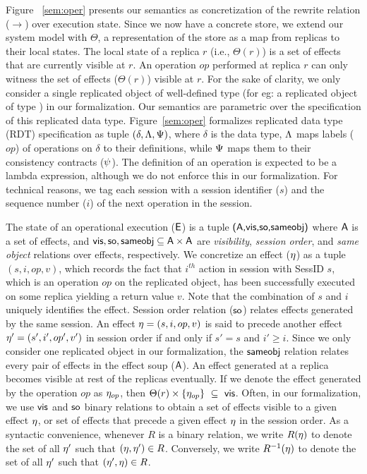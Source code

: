 Figure ~\ref{sem:oper} presents our semantics as concretization of the rewrite
relation ($\xrightarrow{}$) over execution state. Since we now have a concrete
store, we extend our system model with $\Theta$, a representation of the store
as a map from replicas to their local states. The local state of a replica $r$
(i.e., $\Theta(r)$) is a set of effects that are currently visible at $r$.  An
operation $op$ performed at replica $r$ can only witness the set of effects
($\Theta(r)$) visible at $r$. For the sake of clarity, we only consider a
single replicated object of well-defined type (for eg: a replicated object of
type ) in our formalization.  Our semantics are parametric over
the specification of this replicated data type. Figure~\ref{sem:oper}
formalizes replicated data type (RDT) specification as tuple
$(\delta,\Lambda,\Psi)$, where $\delta$ is the data type, $\Lambda$ maps labels
($op$) of operations on $\delta$ to their definitions, while $\Psi$ maps them
to their consistency contracts ($\psi$). The definition of an operation is
expected to be a lambda expression, although we do not enforce this in our
formalization. For technical reasons, we tag each session with a session
identifier ($s$) and the sequence number ($i$) of the next operation in the
session.

The state of an operational execution (${\normalfont \textsf{E}}$) is a tuple ${\normalfont \textsf{({\normalfont \textsf{A}},\allowbreak {\normalfont \textsf{vis}},\allowbreak {\normalfont \textsf{so}},\allowbreak {\normalfont \textsf{sameobj}})}}$ where
${\normalfont \textsf{A}}$ is a set of effects, and ${\normalfont \textsf{vis}},{\normalfont \textsf{so}}, {\normalfont \textsf{sameobj}} \subseteq {\normalfont \textsf{A}}
\times {\normalfont \textsf{A}}$ are \emph{visibility}, \emph{session order}, and \emph{same
object} relations over effects, respectively. We concretize an effect ($\eta$)
as a tuple $(s,i,op,v)$, which records the fact that $i^{th}$ action in session
with {\sf SessID} $s$, which is an operation $op$ on the replicated object, has
been successfully executed on some replica yielding a return value $v$. Note
that the combination of $s$ and $i$ uniquely identifies the effect. Session
order relation (${\normalfont \textsf{so}}$) relates effects generated by the same session. An
effect $\eta = (s,i,op,v)$ is said to precede another effect $\eta' =
(s',i',op',v')$ in session order if and only if $s'=s$ and $i'\ge i$. Since we
only consider one replicated object in our formalization, the ${\normalfont \textsf{sameobj}}$
relation relates every pair of effects in the effect soup (${\normalfont \textsf{A}}$). An
effect generated at a replica becomes visible at rest of the replicas
eventually.  If we denote the effect generated by the operation $op$ as
$\eta_{op}$, then $\Theta(r) \times \{\eta_{op}\} ~\subseteq~ {\normalfont \textsf{vis}}$. Often, in
our formalization, we use ${\normalfont \textsf{vis}}$ and ${\normalfont \textsf{so}}$ binary relations to obtain a set
of effects visible to a given effect $\eta$, or set of effects that precede a
given effect $\eta$ in the session order. As a syntactic convenience, whenever
$R$ is a binary relation, we write $R(\eta)$ to denote the set of all $\eta'$
such that $(\eta,\eta') \in R$.  Conversely, we write $R^{-1}(\eta)$ to denote
the set of all $\eta'$ such that $(\eta',\eta) \in R$.

